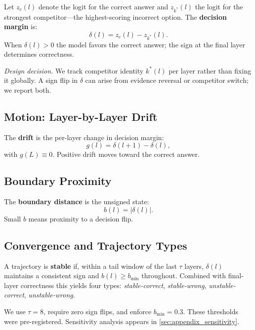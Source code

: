 \documentclass{article}
\begin{document}
Let $z_c(l)$ denote the logit for the correct answer and $z_{k^*}(l)$ the logit for the strongest competitor---the highest-scoring incorrect option.  The \textbf{decision margin} is:
\begin{equation}
  \delta(l) = z_c(l) - z_{k^*}(l).
  \label{eq:delta}
\end{equation}
When $\delta(l) > 0$ the model favors the correct answer; the sign at the final layer determines correctness.

\emph{Design decision.}  We track competitor identity $k^*(l)$ per layer rather than fixing it globally.  A sign flip in $\delta$ can arise from evidence reversal or competitor switch; we report both.

\subsection{Motion: Layer-by-Layer Drift}

The \textbf{drift} is the per-layer change in decision margin:
\begin{equation}
  g(l) = \delta(l{+}1) - \delta(l),
  \label{eq:drift}
\end{equation}
with $g(L) \equiv 0$.  Positive drift moves toward the correct answer.

\subsection{Boundary Proximity}

The \textbf{boundary distance} is the unsigned state:
\begin{equation}
  b(l) = |\delta(l)|.
  \label{eq:boundary}
\end{equation}
Small $b$ means proximity to a decision flip.

\subsection{Convergence and Trajectory Types}

A trajectory is \textbf{stable} if, within a tail window of the last $\tau$ layers, $\delta(l)$ maintains a consistent sign and $b(l) \geq b_{\min}$ throughout.  Combined with final-layer correctness this yields four types: \emph{stable-correct}, \emph{stable-wrong}, \emph{unstable-correct}, \emph{unstable-wrong}.

We use $\tau = 8$, require zero sign flips, and enforce $b_{\min} = 0.3$.  These thresholds were pre-registered.  Sensitivity analysis appears in \cref{sec:appendix_sensitivity}.
\end{document}
